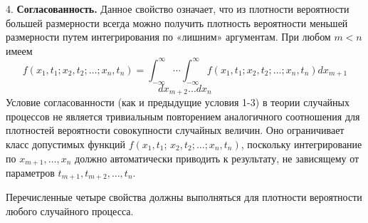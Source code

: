 4. \textbf{Согласованность.}
Данное свойство означает, что из плотности вероятности большей размерности всегда можно получить плотность вероятности меньшей размерности путем интегрирования по «лишним» аргументам. При любом $m<n$ имеем
$$f\left(x_1, t_1\right. ; \left.x_2, t_2 ; \ldots ; x_n, t_n\right)=\int_{-\infty}^{\infty} \cdots \int_{-\infty}^{\infty} f\left(x_1, t_1 ; x_2, t_2 ; \ldots ; x_n, t_n\right) d x_{m+1}$$$$ d x_{m+2} \ldots d x_n$$
Условие согласованности (как и предыдущие условия 1-3) в теории случайных процессов не является тривиальным повторением аналогичного соотношения для плотностей вероятности совокупности случайных величин. Оно ограничивает класс допустимых функций $f\left(x_1, t_1\right.$; $\left.x_2, t_2 ; \ldots ; x_n, t_n\right)$, поскольку интегрирование по $x_{m+1}, \ldots, x_n$ должно автоматически приводить к результату, не зависящему от параметров $t_{m+1}, t_{m+2}, \ldots, t_n$.

Перечисленные четыре свойства должны выполняться для плотности вероятности любого случайного процесса.
